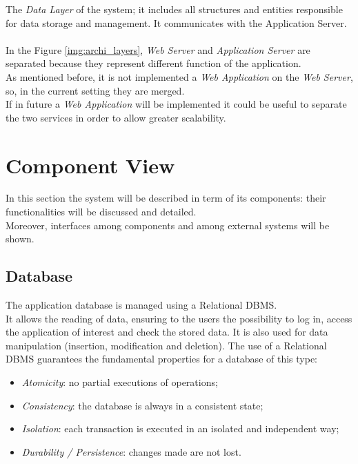 The \textit{Data Layer} of the system; it includes all structures and entities responsible for data storage and management. It communicates with the Application Server.\\\\

In the Figure \ref{img:archi_layers}, \textit{Web Server} and \textit{Application Server} are separated because they represent different function of the application.\\
As mentioned before, it is not implemented a \textit{Web Application} on the \textit{Web Server}, so, in the current setting they are merged.\\ If in future a \textit{Web Application} will be implemented it could be useful to separate the two services in order to allow greater scalability.
\clearpage

\section{Component View}
In this section the system will be described in term of its components:  their functionalities will be discussed and detailed.\\
Moreover, interfaces among components and among external systems will be shown.

\subsection{Database}
The application database is managed using a Relational DBMS. \\
It allows the reading of data, ensuring to the users the possibility to log in, access the application of interest and check the stored data.
It is also used for data manipulation (insertion, modification and deletion).
The use of a Relational DBMS guarantees the fundamental properties for a database of this type:
\begin{itemize}
  \item \textit{Atomicity}: no partial executions of operations;
  \item \textit{Consistency}: the database is always in a consistent state;
  \item \textit{Isolation}: each transaction is executed in an isolated and independent way;
  \item \textit{Durability / Persistence}: changes made are not lost.
\end{itemize}

